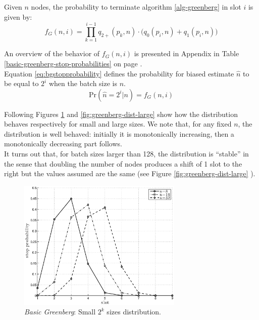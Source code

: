 \documentclass[11pt,a4paper,twoside,openright]{book}
\newcommand{\fg}{f_{G}}
\begin{document}
Given $n$ nodes, the probability to terminate algorithm \ref{alg-greenberg} in slot $i$ is given by:
\begin{equation}
\fg(n,i)=\prod_{k=1}^{i-1}q_{2+}(p_{k},n) \cdot \bigl( q_{0}(p_{i},n)+q_{1}(p_{i},n)\bigr)  
\label{eq:bgstopprobability}
\end{equation}

An overview of the behavior of $\fg(n,i)$ is presented in Appendix in Table \ref{basic-greenberg-stop-probabilities} on page \pageref{basic-greenberg-stop-probabilities}.\\ Equation \eqref{eq:bgstopprobability} defines the probability for biased estimate $\hat{n}$ to be equal to $2^{i}$ when the batch size is $n$. 
\begin{equation}
\textrm{Pr}\left( \hat{n}=2^{i}|n\right)=\fg(n,i)  
\end{equation}

Following Figures \ref{fig:greenberg-dist-small} and \ref{fig:greenberg-dist-large} show how the distribution behaves respectively for small and large sizes.
We note that, for any fixed $n$, the distribution is well behaved: initially it is monotonically increasing, then a monotonically decreasing part follows.\\
It turns out that, for batch sizes larger than 128, the distribution is ``stable'' in the sense that doubling the number of nodes produces a shift of 1 slot to the right but the values assumed are the same (see Figure \ref{fig:greenberg-dist-large} ).\\


\begin{figure}[htbp]
\begin{center}
\includegraphics[width=0.7\textwidth]{matlab/Greenberg_stop_prob/greenberg-stop-distribution-uniformity-init}
\caption{\emph{Basic Greenberg}:  Small $2^{k}$ sizes distribution.}
\label{fig:greenberg-dist-small}
\end{center}
\end{figure}
\end{document}
